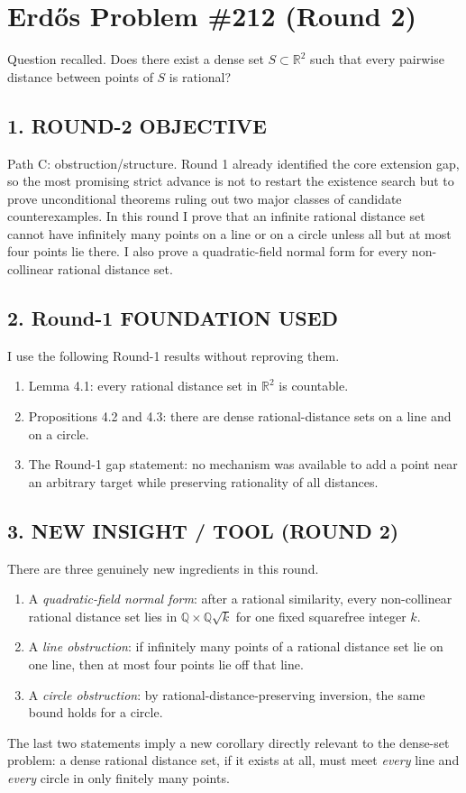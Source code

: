 \section*{Erd\H{o}s Problem \#212 (Round 2)}

Question recalled. Does there exist a dense set $S\subset \mathbb{R}^2$ such that every pairwise distance between points of $S$ is rational?

\subsection*{1. ROUND-2 OBJECTIVE}
Path C: obstruction/structure. Round 1 already identified the core extension gap, so the most promising strict advance is not to restart the existence search but to prove unconditional theorems ruling out two major classes of candidate counterexamples. In this round I prove that an infinite rational distance set cannot have infinitely many points on a line or on a circle unless all but at most four points lie there. I also prove a quadratic-field normal form for every non-collinear rational distance set.

\subsection*{2. Round-1 FOUNDATION USED}
I use the following Round-1 results without reproving them.
\begin{enumerate}
\item Lemma 4.1: every rational distance set in $\mathbb{R}^2$ is countable.
\item Propositions 4.2 and 4.3: there are dense rational-distance sets on a line and on a circle.
\item The Round-1 gap statement: no mechanism was available to add a point near an arbitrary target while preserving rationality of all distances.
\end{enumerate}

\subsection*{3. NEW INSIGHT / TOOL (ROUND 2)}
There are three genuinely new ingredients in this round.
\begin{enumerate}
\item A \emph{quadratic-field normal form}: after a rational similarity, every non-collinear rational distance set lies in $\mathbb{Q}\times \mathbb{Q}\sqrt{k}$ for one fixed squarefree integer $k$.
\item A \emph{line obstruction}: if infinitely many points of a rational distance set lie on one line, then at most four points lie off that line.
\item A \emph{circle obstruction}: by rational-distance-preserving inversion, the same bound holds for a circle.
\end{enumerate}
The last two statements imply a new corollary directly relevant to the dense-set problem: a dense rational distance set, if it exists at all, must meet \emph{every} line and \emph{every} circle in only finitely many points.

